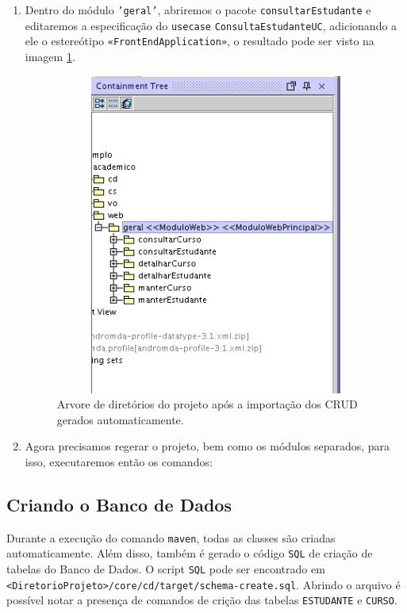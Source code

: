 \begin{enumerate}
\item Dentro do módulo \texttt{'geral'}, abriremos o pacote
\texttt{consultarEstudante} e editaremos a especificação do \texttt{usecase}
\texttt{ConsultaEstudanteUC}, adicionando a ele o estereótipo
\texttt{«FrontEndApplication»}, o resultado
pode ser visto na imagem \ref{resultado_usecase_principal}.

\begin{figure}[H]
	\centering
	\includegraphics[width=300pt,height=300pt]{imgs/tutorial-mdarte-0025.png}
	\caption{Arvore de diretórios do projeto após a importação dos CRUD gerados
	automaticamente.}
	\label{resultado_usecase_principal}
\end{figure}

\item Agora precisamos regerar o projeto, bem como os módulos separados, para
isso, executaremos então os comandos:
	
\begin{framed}
	
\end{framed}

\end{enumerate}

\subsection{Criando o Banco de Dados}

Durante a execução do comando \texttt{maven}, todas as classes são criadas
automaticamente. Além disso, também é gerado o código \texttt{SQL} de criação de
tabelas do Banco de Dados. O script \texttt{SQL} pode ser encontrado em
\texttt{<DiretorioProjeto>/core/cd/target/schema-create.sql}. Abrindo o arquivo
é possível notar a presença de comandos de crição das tabelas \texttt{ESTUDANTE}
e \texttt{CURSO}.

